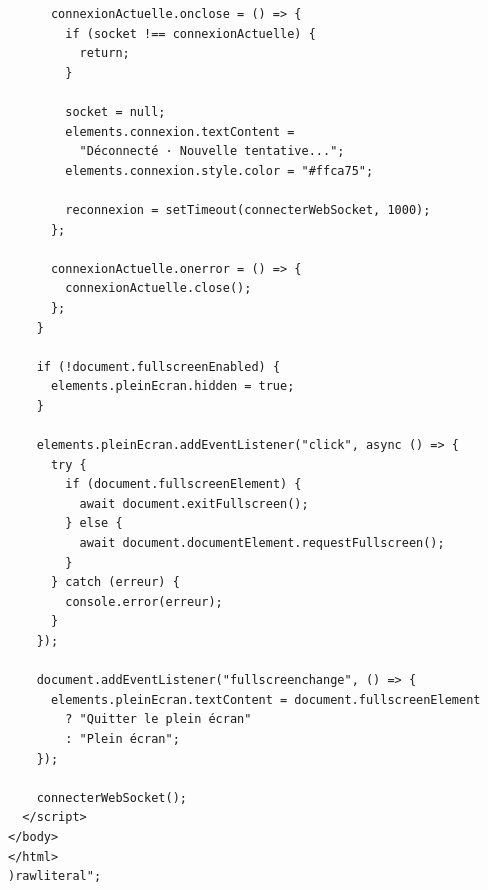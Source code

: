 \documentclass[a4paper,10pt]{article}
\begin{document}
\begin{lstlisting}
      connexionActuelle.onclose = () => {
        if (socket !== connexionActuelle) {
          return;
        }

        socket = null;
        elements.connexion.textContent =
          "Déconnecté · Nouvelle tentative...";
        elements.connexion.style.color = "#ffca75";

        reconnexion = setTimeout(connecterWebSocket, 1000);
      };

      connexionActuelle.onerror = () => {
        connexionActuelle.close();
      };
    }

    if (!document.fullscreenEnabled) {
      elements.pleinEcran.hidden = true;
    }

    elements.pleinEcran.addEventListener("click", async () => {
      try {
        if (document.fullscreenElement) {
          await document.exitFullscreen();
        } else {
          await document.documentElement.requestFullscreen();
        }
      } catch (erreur) {
        console.error(erreur);
      }
    });

    document.addEventListener("fullscreenchange", () => {
      elements.pleinEcran.textContent = document.fullscreenElement
        ? "Quitter le plein écran"
        : "Plein écran";
    });

    connecterWebSocket();
  </script>
</body>
</html>
)rawliteral";
\end{lstlisting}
\end{document}

